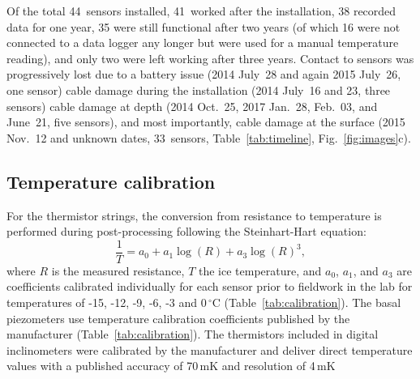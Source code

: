 \documentclass[utf8]{article}
\begin{document}
    Of the total 44~sensors installed, 41~worked after the installation, 38
    recorded data for one year, 35 were still functional after two years (of
    which 16 were not connected to a data logger any longer but were used for a
    manual temperature reading), and only two were left
    working after three years. Contact to sensors was progressively lost due to a
    battery issue (2014 July~28 and again 2015 July~26, one sensor) cable
    damage during the installation (2014 July~16 and 23, three sensors) cable
    damage at depth (2014 Oct.~25, 2017 Jan.~28, Feb.~03, and June~21, five
    sensors), and most importantly, cable damage at the surface (2015 Nov.~12
    and unknown dates, 33~sensors, Table~\ref{tab:timeline},
    Fig.~\ref{fig:images}c).


\subsection{Temperature calibration}


    For the thermistor strings, the conversion from resistance to temperature
    is performed during post-processing following the Steinhart-Hart equation:
    \begin{equation}
      \frac{1}{T} = a_0 + a_1 \log(R) + a_3 \log(R)^3,
    \end{equation}
    where $R$ is the measured resistance, $T$ the ice temperature, and $a_0$,
    $a_1$, and $a_3$ are coefficients calibrated individually for each sensor
    prior to fieldwork in the lab for temperatures of -15, -12, -9, -6, -3 and
    0\,$^\circ$C (Table~\ref{tab:calibration}). The basal piezometers use
    temperature calibration coefficients published by the manufacturer
    (Table~\ref{tab:calibration}). The thermistors included in digital
    inclinometers were calibrated by the manufacturer and deliver direct
    temperature values with a published accuracy of 70\,mK and resolution
    of 4\,mK \citep[p.~44]{Ryser.2014}
\end{document}

